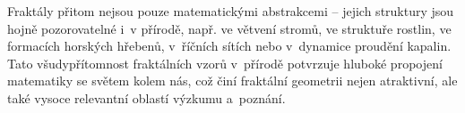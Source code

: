 Fraktály přitom nejsou pouze matematickými abstrakcemi -- jejich struktury jsou hojně pozorovatelné i~v přírodě, např. ve větvení stromů, ve struktuře rostlin, ve formacích horských hřebenů, v~říčních sítích nebo v~dynamice proudění kapalin. Tato všudypřítomnost fraktálních vzorů v~přírodě potvrzuje hluboké propojení matematiky se světem kolem nás, což činí fraktální geometrii nejen atraktivní, ale také vysoce relevantní oblastí výzkumu a~poznání.